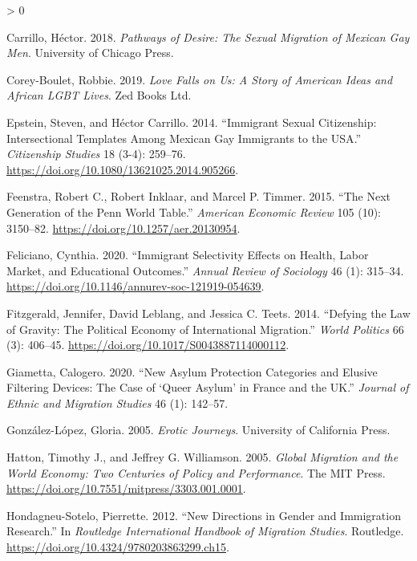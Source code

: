 \documentclass[
  11pt,
]{article}
\newlength{\cslhangindent}
\newenvironment{CSLReferences}[2] %
 {%
  \setlength{\parindent}{0pt}
  \ifodd #1 \everypar{\setlength{\hangindent}{\cslhangindent}}\ignorespaces\fi
  \ifnum #2 > 0
  \setlength{\parskip}{#2\baselineskip}
  \fi
 }%
 {}
\begin{document}
\begin{CSLReferences}{1}{0}
\leavevmode\hypertarget{ref-carrillo_2018}{}%
Carrillo, Héctor. 2018. \emph{Pathways of {Desire}: {The} {Sexual} {Migration} of {Mexican} {Gay} {Men}}. University of Chicago Press.

\leavevmode\hypertarget{ref-corey-boulet_2019}{}%
Corey-Boulet, Robbie. 2019. \emph{Love {Falls} on {Us}: A Story of {American} Ideas and {African} {LGBT} Lives}. Zed Books Ltd.

\leavevmode\hypertarget{ref-epstein_2014}{}%
Epstein, Steven, and Héctor Carrillo. 2014. {``Immigrant Sexual Citizenship: Intersectional Templates Among {Mexican} Gay Immigrants to the {USA}.''} \emph{Citizenship Studies} 18 (3-4): 259--76. \url{https://doi.org/10.1080/13621025.2014.905266}.

\leavevmode\hypertarget{ref-feenstra_2015}{}%
Feenstra, Robert C., Robert Inklaar, and Marcel P. Timmer. 2015. {``The {Next} {Generation} of the {Penn} {World} {Table}.''} \emph{American Economic Review} 105 (10): 3150--82. \url{https://doi.org/10.1257/aer.20130954}.

\leavevmode\hypertarget{ref-feliciano_2020}{}%
Feliciano, Cynthia. 2020. {``Immigrant {Selectivity} {Effects} on {Health}, {Labor} {Market}, and {Educational} {Outcomes}.''} \emph{Annual Review of Sociology} 46 (1): 315--34. \url{https://doi.org/10.1146/annurev-soc-121919-054639}.

\leavevmode\hypertarget{ref-fitzgerald_2014}{}%
Fitzgerald, Jennifer, David Leblang, and Jessica C. Teets. 2014. {``Defying the {Law} of {Gravity}: {The} {Political} {Economy} of {International} {Migration}.''} \emph{World Politics} 66 (3): 406--45. \url{https://doi.org/10.1017/S0043887114000112}.

\leavevmode\hypertarget{ref-giametta_2020}{}%
Giametta, Calogero. 2020. {``New Asylum Protection Categories and Elusive Filtering Devices: The Case of {`{Queer} Asylum'} in {France} and the {UK}.''} \emph{Journal of Ethnic and Migration Studies} 46 (1): 142--57.

\leavevmode\hypertarget{ref-gonzalez-lopez_2005}{}%
González-López, Gloria. 2005. \emph{Erotic {Journeys}}. University of California Press.

\leavevmode\hypertarget{ref-hatton_2005a}{}%
Hatton, Timothy J., and Jeffrey G. Williamson. 2005. \emph{Global {Migration} and the {World} {Economy}: {Two} {Centuries} of {Policy} and {Performance}}. The MIT Press. \url{https://doi.org/10.7551/mitpress/3303.001.0001}.

\leavevmode\hypertarget{ref-hondagneu-sotelo_2012}{}%
Hondagneu-Sotelo, Pierrette. 2012. {``New Directions in Gender and Immigration Research.''} In \emph{Routledge {International} {Handbook} of {Migration} {Studies}}. Routledge. \url{https://doi.org/10.4324/9780203863299.ch15}.


\end{CSLReferences}
\end{document}
